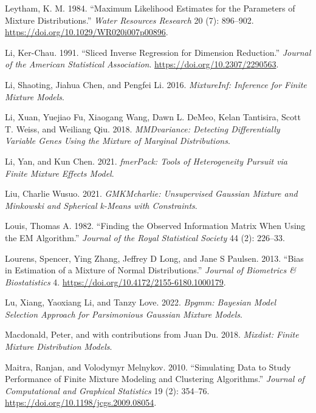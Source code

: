 \begin{CSLReferences}{1}{0}
\leavevmode{}%
Leytham, K. M. 1984. {``Maximum {Likelihood Estimates} for the {Parameters} of {Mixture Distributions}.''} \emph{Water Resources Research} 20 (7): 896--902. \url{https://doi.org/10.1029/WR020i007p00896}.

\leavevmode{}%
Li, Ker-Chau. 1991. {``Sliced {Inverse} {Regression} for {Dimension} {Reduction}.''} \emph{Journal of the American Statistical Association}. \url{https://doi.org/10.2307/2290563}.

\leavevmode{}%
Li, Shaoting, Jiahua Chen, and Pengfei Li. 2016. \emph{MixtureInf: Inference for Finite Mixture Models}.

\leavevmode{}%
Li, Xuan, Yuejiao Fu, Xiaogang Wang, Dawn L. DeMeo, Kelan Tantisira, Scott T. Weiss, and Weiliang Qiu. 2018. \emph{MMDvariance: Detecting Differentially Variable Genes Using the Mixture of Marginal Distributions}.

\leavevmode{}%
Li, Yan, and Kun Chen. 2021. \emph{fmerPack: Tools of Heterogeneity Pursuit via Finite Mixture Effects Model}.

\leavevmode{}%
Liu, Charlie Wusuo. 2021. \emph{GMKMcharlie: Unsupervised Gaussian Mixture and Minkowski and Spherical k-Means with Constraints}.

\leavevmode{}%
Louis, Thomas A. 1982. {``Finding the {Observed Information Matrix} When {Using} the {EM Algorithm}.''} \emph{Journal of the Royal Statistical Society} 44 (2): 226--33.

\leavevmode{}%
Lourens, Spencer, Ying Zhang, Jeffrey D Long, and Jane S Paulsen. 2013. {``Bias in {Estimation} of a {Mixture} of {Normal Distributions}.''} \emph{Journal of Biometrics \& Biostatistics} 4. \url{https://doi.org/10.4172/2155-6180.1000179}.

\leavevmode{}%
Lu, Xiang, Yaoxiang Li, and Tanzy Love. 2022. \emph{Bpgmm: Bayesian Model Selection Approach for Parsimonious Gaussian Mixture Models}.

\leavevmode{}%
Macdonald, Peter, and with contributions from Juan Du. 2018. \emph{Mixdist: Finite Mixture Distribution Models}.

\leavevmode{}%
Maitra, Ranjan, and Volodymyr Melnykov. 2010. {``Simulating {Data} to {Study Performance} of {Finite Mixture Modeling} and {Clustering Algorithms}.''} \emph{Journal of Computational and Graphical Statistics} 19 (2): 354--76. \url{https://doi.org/10.1198/jcgs.2009.08054}.


\end{CSLReferences}
